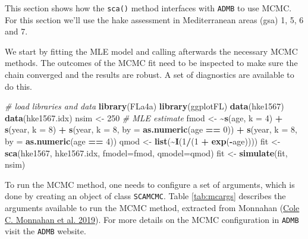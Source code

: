 \documentclass[
]{book}
\newenvironment{Shaded}{\begin{snugshade}}{\end{snugshade}}
\newcommand{\AttributeTok}[1]{\textcolor[rgb]{0.13,0.29,0.53}{#1}}
\newcommand{\CommentTok}[1]{\textcolor[rgb]{0.56,0.35,0.01}{\textit{#1}}}
\newcommand{\DecValTok}[1]{\textcolor[rgb]{0.00,0.00,0.81}{#1}}
\newcommand{\ErrorTok}[1]{\textcolor[rgb]{0.64,0.00,0.00}{\textbf{#1}}}
\newcommand{\FunctionTok}[1]{\textcolor[rgb]{0.13,0.29,0.53}{\textbf{#1}}}
\newcommand{\NormalTok}[1]{#1}
\newcommand{\OtherTok}[1]{\textcolor[rgb]{0.56,0.35,0.01}{#1}}
\newcommand{\SpecialCharTok}[1]{\textcolor[rgb]{0.81,0.36,0.00}{\textbf{#1}}}
\begin{document}
This section shows how the \texttt{sca()} method interfaces with \texttt{ADMB} to use MCMC. For this section we'll use the hake assessment in Mediterranean areas (gsa) 1, 5, 6 and 7.

We start by fitting the MLE model and calling afterwards the necessary MCMC methods. The outcomes of the MCMC fit need to be inspected to make sure the chain converged and the results are robust. A set of diagnostics are available to do this.

\begin{Shaded}
\begin{Highlighting}[]
\CommentTok{\# load libraries and data}
\FunctionTok{library}\NormalTok{(FLa4a)}
\FunctionTok{library}\NormalTok{(ggplotFL)}
\FunctionTok{data}\NormalTok{(hke1567)}
\FunctionTok{data}\NormalTok{(hke1567.idx)}
\NormalTok{nsim }\OtherTok{\textless{}{-}} \DecValTok{250}
\CommentTok{\# MLE estimate}
\NormalTok{fmod }\OtherTok{\textless{}{-}} \ErrorTok{\textasciitilde{}}\FunctionTok{s}\NormalTok{(age, }\AttributeTok{k =} \DecValTok{4}\NormalTok{) }\SpecialCharTok{+}
    \FunctionTok{s}\NormalTok{(year, }\AttributeTok{k =} \DecValTok{8}\NormalTok{) }\SpecialCharTok{+}
    \FunctionTok{s}\NormalTok{(year, }\AttributeTok{k =} \DecValTok{8}\NormalTok{, }\AttributeTok{by =} \FunctionTok{as.numeric}\NormalTok{(age }\SpecialCharTok{==} \DecValTok{0}\NormalTok{)) }\SpecialCharTok{+}
    \FunctionTok{s}\NormalTok{(year, }\AttributeTok{k =} \DecValTok{8}\NormalTok{, }\AttributeTok{by =} \FunctionTok{as.numeric}\NormalTok{(age }\SpecialCharTok{==} \DecValTok{4}\NormalTok{))}
\NormalTok{qmod }\OtherTok{\textless{}{-}} \FunctionTok{list}\NormalTok{(}\SpecialCharTok{\textasciitilde{}}\FunctionTok{I}\NormalTok{(}\DecValTok{1}\SpecialCharTok{/}\NormalTok{(}\DecValTok{1} \SpecialCharTok{+} \FunctionTok{exp}\NormalTok{(}\SpecialCharTok{{-}}\NormalTok{age))))}
\NormalTok{fit }\OtherTok{\textless{}{-}} \FunctionTok{sca}\NormalTok{(hke1567, hke1567.idx, }\AttributeTok{fmodel=}\NormalTok{fmod, }\AttributeTok{qmodel=}\NormalTok{qmod)}
\NormalTok{fit }\OtherTok{\textless{}{-}} \FunctionTok{simulate}\NormalTok{(fit, nsim)}
\end{Highlighting}
\end{Shaded}

To run the MCMC method, one needs to configure a set of arguments, which is done by creating an object of class \texttt{SCAMCMC}. Table \ref{tab:mcargs} describes the arguments available to run the MCMC method, extracted from Monnahan (\protect\hyperlink{ref-monnahan2019}{Cole C. Monnahan et al. 2019}). For more details on the MCMC configuration in \texttt{ADMB} visit the \texttt{ADMB} website.
\end{document}
